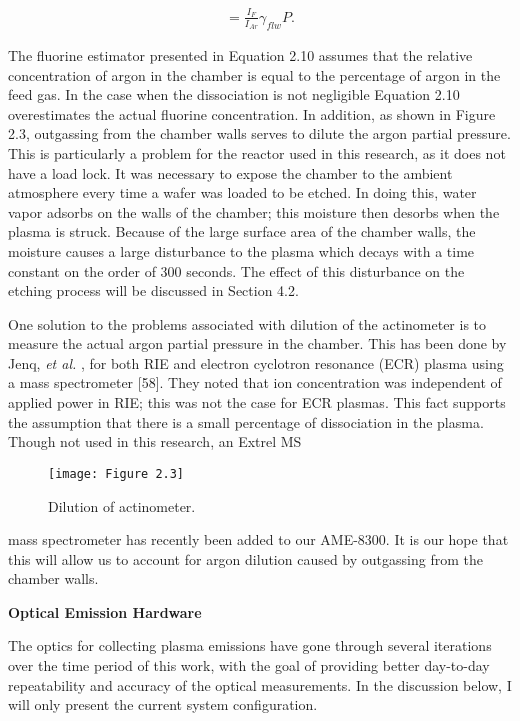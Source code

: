 
\begin{align}
	[F]= \frac{I_{F}}{I_{Ar}}\gamma_{flw}P.
\end{align}


The fluorine estimator presented in Equation 2.10 assumes that the relative concentration of argon in the chamber is equal to the percentage of argon in the feed gas. In the case
when the dissociation is not negligible Equation 2.10 overestimates the actual fluorine concentration. In addition, as shown in Figure 2.3, outgassing from the chamber walls serves
to dilute the argon partial pressure. This is particularly a problem for the reactor used in
this research, as it does not have a load lock. It was necessary to expose the chamber to
the ambient atmosphere every time a wafer was loaded to be etched. In doing this, water
vapor adsorbs on the walls of the chamber; this moisture then desorbs when the plasma is
struck. Because of the large surface area of the chamber walls, the moisture causes a large
disturbance to the plasma which decays with a time constant on the order of 300 seconds.
The effect of this disturbance on the etching process will be discussed in Section 4.2.

One solution to the problems associated with dilution of the actinometer is to measure
the actual argon partial pressure in the chamber. This has been done by Jenq, \textit{et al.} ,
for both RIE and electron cyclotron resonance (ECR) plasma using a mass spectrometer
[58]. They noted that ion concentration was independent of applied power in RIE; this was
not the case for ECR plasmas. This fact supports the assumption that there is a small
percentage of dissociation in the plasma. Though not used in this research, an Extrel MS


\begin{figure}[H]
	\centering
	\texttt{[image: Figure 2.3]}
	\bf\caption{ Dilution of actinometer.}
	\label{fig:2.3}
\end{figure}


 mass spectrometer has recently been added to our AME-8300. It is our hope that this will allow us to account for argon dilution caused by outgassing from the chamber walls.


\noindent\large\bf Optical Emission Hardware

\normalsize\normalfont The optics for collecting plasma emissions have gone through several iterations over the time period of this work, with the goal of providing better day-to-day repeatability and accuracy of the optical measurements. In the discussion below, I will only present the current system configuration.

